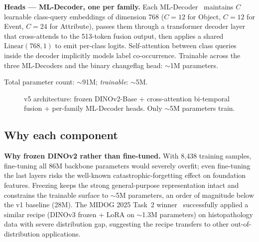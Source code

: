 \documentclass[journal]{IEEEtran}
\begin{document}
\textbf{Heads --- ML-Decoder, one per family.} Each ML-Decoder~\cite{ridnik2023mldecoder} maintains $C$ learnable class-query embeddings of dimension 768 ($C{=}12$ for Object, $C{=}12$ for Event, $C{=}24$ for Attribute), passes them through a transformer decoder layer that cross-attends to the 513-token fusion output, then applies a shared $\mathrm{Linear}(768,1)$ to emit per-class logits. Self-attention between class queries inside the decoder implicitly models label co-occurrence. Trainable across the three ML-Decoders and the binary changeflag head: $\sim$1M parameters.

Total parameter count: $\sim$91M; \emph{trainable}: $\sim$5M.

\begin{figure}[!t]
  \centering
  \caption{v5 architecture: frozen DINOv2-Base + cross-attention bi-temporal fusion + per-family ML-Decoder heads. Only $\sim$5M parameters train.}
  \label{fig:architecture}
\end{figure}

\subsection{Why each component}\label{ssec:why}

\textbf{Why frozen DINOv2 rather than fine-tuned.} With 8{,}438 training samples, fine-tuning all 86M backbone parameters would severely overfit; even fine-tuning the last layers risks the well-known catastrophic-forgetting effect on foundation features. Freezing keeps the strong general-purpose representation intact and constrains the trainable surface to $\sim$5M parameters, an order of magnitude below the v1 baseline (28M). The MIDOG 2025 Task~2 winner~\cite{balezo2025midog} successfully applied a similar recipe (DINOv3 frozen + LoRA on $\sim$1.3M parameters) on histopathology data with severe distribution gap, suggesting the recipe transfers to other out-of-distribution applications.
\end{document}
